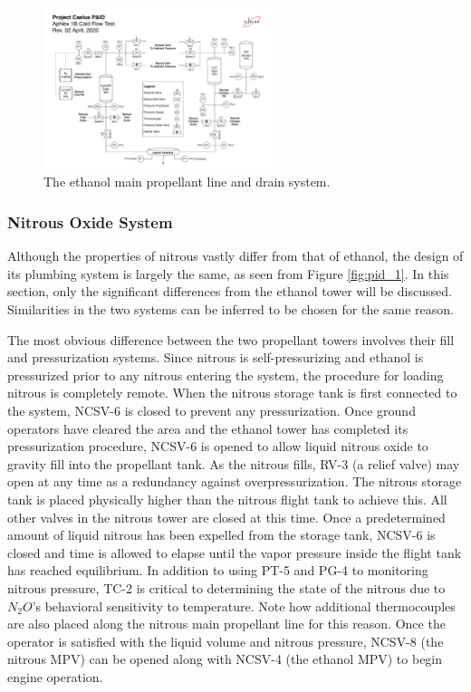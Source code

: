 \documentclass[9pt]{article} %
\numberwithin{equation}{section} %
\begin{document}
\begin{figure}[!htb] 
    \centering
    \includegraphics[scale=0.5, width=0.6\textwidth, trim={5cm 0cm 14cm 14cm}, clip]{Aphlex1B_04-02-2020_P&ID.pdf} %
    \caption{The ethanol main propellant line and drain system.}
    \label{fig:ethanol_drain_system}
\end{figure}

\subsubsection{Nitrous Oxide System}
\hspace{\parindent} Although the properties of nitrous vastly differ from that of ethanol, the design of its plumbing system is largely the same, as seen from Figure \ref{fig:pid_1}. In this section, only the significant differences from the ethanol tower will be discussed. Similarities in the two systems can be inferred to be chosen for the same reason.

The most obvious difference between the two propellant towers involves their fill and pressurization systems. Since nitrous is self-pressurizing and ethanol is pressurized prior to any nitrous entering the system, the procedure for loading nitrous is completely remote. When the nitrous storage tank is first connected to the system, NCSV-6 is closed to prevent any pressurization. Once ground operators have cleared the area and the ethanol tower has completed its pressurization procedure, NCSV-6 is opened to allow liquid nitrous oxide to gravity fill into the propellant tank. As the nitrous fills, RV-3 (a relief valve) may open at any time as a redundancy against overpressurization. The nitrous storage tank is placed physically higher than the nitrous flight tank to achieve this. All other valves in the nitrous tower are closed at this time. Once a predetermined amount of liquid nitrous has been expelled from the storage tank, NCSV-6 is closed and time is allowed to elapse until the vapor pressure inside the flight tank has reached equilibrium. In addition to using PT-5 and PG-4 to monitoring nitrous pressure, TC-2 is critical to determining the state of the nitrous due to $N_{2}O$'s behavioral sensitivity to temperature. Note how additional thermocouples are also placed along the nitrous main propellant line for this reason. Once the operator is satisfied with the liquid volume and nitrous pressure, NCSV-8 (the nitrous MPV) can be opened along with NCSV-4 (the ethanol MPV) to begin engine operation.
\end{document}
